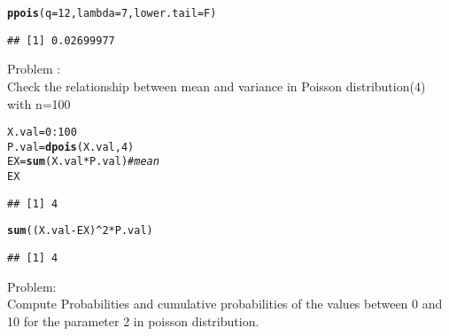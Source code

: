 \documentclass{article}\usepackage[]{graphicx}\usepackage[]{xcolor}
\makeatletter
\newcommand{\hlnum}[1]{\textcolor[rgb]{0.686,0.059,0.569}{#1}}%
\newcommand{\hlcom}[1]{\textcolor[rgb]{0.678,0.584,0.686}{\textit{#1}}}%
\newcommand{\hlopt}[1]{\textcolor[rgb]{0,0,0}{#1}}%
\newcommand{\hldef}[1]{\textcolor[rgb]{0.345,0.345,0.345}{#1}}%
\newcommand{\hlkwb}[1]{\textcolor[rgb]{0.69,0.353,0.396}{#1}}%
\newcommand{\hlkwc}[1]{\textcolor[rgb]{0.333,0.667,0.333}{#1}}%
\newcommand{\hlkwd}[1]{\textcolor[rgb]{0.737,0.353,0.396}{\textbf{#1}}}%
\newenvironment{kframe}{%
 \def\at@end@of@kframe{}%
 \ifinner\ifhmode%
  \def\at@end@of@kframe{\end{minipage}}%
  \begin{minipage}{\columnwidth}%
 \fi\fi%
 \def\FrameCommand##1{\hskip\@totalleftmargin \hskip-\fboxsep
 \colorbox{shadecolor}{##1}\hskip-\fboxsep
     \hskip-\linewidth \hskip-\@totalleftmargin \hskip\columnwidth}%
 \MakeFramed {\advance\hsize-\width
   \@totalleftmargin\z@ \linewidth\hsize
   \@setminipage}}%
 {\par\unskip\endMakeFramed%
 \at@end@of@kframe}
\newenvironment{knitrout}{}{} %
\makeatother
\begin{document}
\begin{knitrout}
\color{fgcolor}\begin{kframe}
\begin{alltt}
\hlkwd{ppois}\hldef{(}\hlkwc{q}\hldef{=}\hlnum{12}\hldef{,}\hlkwc{lambda}\hldef{=}\hlnum{7}\hldef{,}\hlkwc{lower.tail}\hldef{=F)}
\end{alltt}
\begin{verbatim}
## [1] 0.02699977
\end{verbatim}
\end{kframe}
\end{knitrout}
Problem :\\ Check the relationship between mean and variance in Poisson distribution(4)
with n=100
\begin{knitrout}
\color{fgcolor}\begin{kframe}
\begin{alltt}
\hldef{X.val}\hlkwb{=}\hlnum{0}\hlopt{:}\hlnum{100}
\hldef{P.val}\hlkwb{=}\hlkwd{dpois}\hldef{(X.val,}\hlnum{4}\hldef{)}
\hldef{EX}\hlkwb{=}\hlkwd{sum}\hldef{(X.val}\hlopt{*}\hldef{P.val)} \hlcom{#mean}
\hldef{EX}
\end{alltt}
\begin{verbatim}
## [1] 4
\end{verbatim}
\begin{alltt}
\hlkwd{sum}\hldef{((X.val}\hlopt{-}\hldef{EX)}\hlopt{^}\hlnum{2}\hlopt{*}\hldef{P.val)}
\end{alltt}
\begin{verbatim}
## [1] 4
\end{verbatim}
\end{kframe}
\end{knitrout}
Problem:\\ Compute Probabilities and cumulative probabilities of the values between 0 and
10 for the parameter 2 in poisson distribution.
\end{document}
